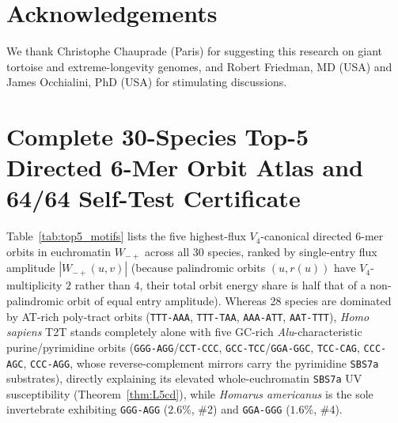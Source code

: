 \documentclass[11pt,a4paper]{article}
\renewcommand{\_}{\origunderscore\penalty200\relax}
\theoremstyle{remark}
\begin{document}
\section*{Acknowledgements}
We thank Christophe Chauprade (Paris) for suggesting this research on giant tortoise and extreme-longevity genomes, and Robert Friedman, MD (USA) and James Occhialini, PhD (USA) for stimulating discussions.

\appendix
\section{Complete 30-Species Top-5 Directed 6-Mer Orbit Atlas and 64/64 Self-Test Certificate}
\label{app:motifs}
Table~\ref{tab:top5_motifs} lists the five highest-flux $V_4$-canonical directed 6-mer orbits in euchromatin $W_{-+}$ across all 30 species, ranked by single-entry flux amplitude $|W_{-+}(u,v)|$ (because palindromic orbits $(u, r(u))$ have $V_4$-multiplicity $2$ rather than $4$, their total orbit energy share is half that of a non-palindromic orbit of equal entry amplitude). Whereas 28 species are dominated by AT-rich poly-tract orbits (\texttt{TTT-AAA}, \texttt{TTT-TAA}, \texttt{AAA-ATT}, \texttt{AAT-TTT}), \textit{Homo sapiens} T2T stands completely alone with five GC-rich \textit{Alu}-characteristic purine/pyrimidine orbits (\texttt{GGG-AGG}\slash\texttt{CCT-CCC}, \texttt{GCC-TCC}\slash\texttt{GGA-GGC}, \texttt{TCC-CAG}, \texttt{CCC-AGC}, \texttt{CCC-AGG}, whose reverse-complement mirrors carry the pyrimidine \texttt{SBS7a} substrates), directly explaining its elevated whole-euchromatin \texttt{SBS7a} UV susceptibility (Theorem~\ref{thm:L5cd}), while \textit{Homarus americanus} is the sole invertebrate exhibiting \texttt{GGG-AGG} ($2.6\%$, \#2) and \texttt{GGA-GGG} ($1.6\%$, \#4).
\end{document}
